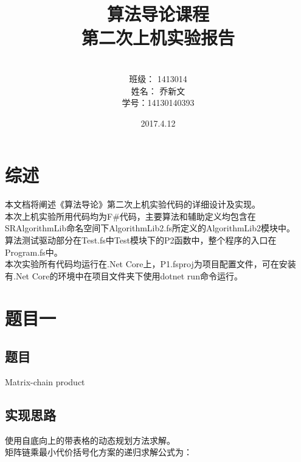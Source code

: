 \documentclass[a4paper]{article}
\begin{document}
\title{\Huge 算法导论课程\\ 第二次上机实验报告}
\author { \vspace{12cm} \\ \LARGE 班级：  1413014  \\ \LARGE 姓名：  乔新文   \\ \LARGE 学号：14130140393} 
\date{ \vspace{4cm} 2017.4.12}

\maketitle
\clearpage

\tableofcontents

\clearpage

\section{综述}

本文档将阐述《算法导论》第二次上机实验代码的详细设计及实现。\\

本次上机实验所用代码均为F\#代码，主要算法和辅助定义均包含在SRAlgorithmLib命名空间下AlgorithmLib2.fs所定义的AlgorithmLib2模块中。\\

算法测试驱动部分在Test.fs中Test模块下的P2函数中，整个程序的入口在Program.fs中。\\

本次实验所有代码均运行在.Net Core上，P1.fsproj为项目配置文件，可在安装有.Net Core的环境中在项目文件夹下使用dotnet run命令运行。\\

\section{题目一}

\subsection{题目}

Matrix-chain product

\subsection{实现思路}

使用自底向上的带表格的动态规划方法求解。\\
矩阵链乘最小代价括号化方案的递归求解公式为：
\end{document}
